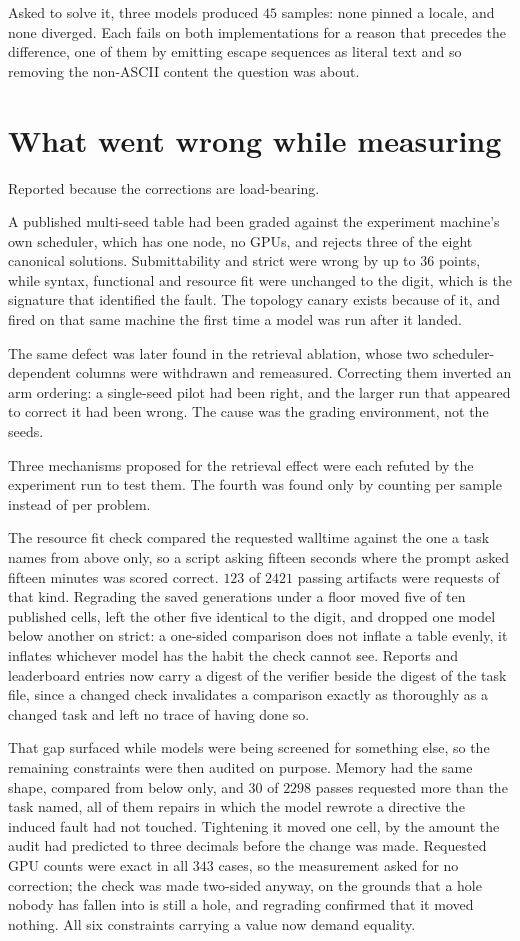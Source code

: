 \documentclass[11pt,a4paper]{article}
\begin{document}
Asked to solve it, three models produced $45$ samples: none pinned a locale, and none diverged.
Each fails on both implementations for a reason that precedes the difference, one of them by
emitting escape sequences as literal text and so removing the non-ASCII content the question was
about.

\section{What went wrong while measuring}

Reported because the corrections are load-bearing.

A published multi-seed table had been graded against the experiment machine's own scheduler, which
has one node, no GPUs, and rejects three of the eight canonical solutions. Submittability and
strict were wrong by up to $36$ points, while syntax, functional and resource fit were unchanged to
the digit, which is the signature that identified the fault. The topology canary exists because of
it, and fired on that same machine the first time a model was run after it landed.

The same defect was later found in the retrieval ablation, whose two scheduler-dependent columns
were withdrawn and remeasured. Correcting them inverted an arm ordering: a single-seed pilot had
been right, and the larger run that appeared to correct it had been wrong. The cause was the
grading environment, not the seeds.

Three mechanisms proposed for the retrieval effect were each refuted by the experiment run to test
them. The fourth was found only by counting per sample instead of per problem.

The resource fit check compared the requested walltime against the one a task names from above
only, so a script asking fifteen seconds where the prompt asked fifteen minutes was scored correct.
$123$ of $2421$ passing artifacts were requests of that kind. Regrading the saved generations under
a floor moved five of ten published cells, left the other five identical to the digit, and dropped
one model below another on strict: a one-sided comparison does not inflate a table evenly, it
inflates whichever model has the habit the check cannot see. Reports and leaderboard entries now
carry a digest of the verifier beside the digest of the task file, since a changed check
invalidates a comparison exactly as thoroughly as a changed task and left no trace of having done
so.

That gap surfaced while models were being screened for something else, so the remaining constraints
were then audited on purpose. Memory had the same shape, compared from below only, and $30$ of
$2298$ passes requested more than the task named, all of them repairs in which the model rewrote a
directive the induced fault had not touched. Tightening it moved one cell, by the amount the audit
had predicted to three decimals before the change was made. Requested GPU counts were exact in all
$343$ cases, so the measurement asked for no correction; the check was made two-sided anyway, on
the grounds that a hole nobody has fallen into is still a hole, and regrading confirmed that it
moved nothing. All six constraints carrying a value now demand equality.
\end{document}
